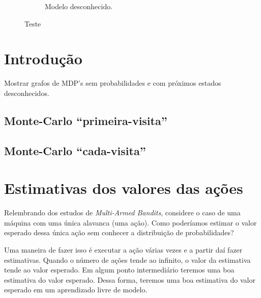 \documentclass{article}
\begin{document}
\begin{figure}[h]
\begin{subfigure}{.3\linewidth}
                    \caption{Modelo desconhecido.}
                \end{subfigure}
                \caption{Teste}
            \end{figure}


    \section{Introdução}
    
        Mostrar grafos de MDP's sem probabilidades e com próximos estados desconhecidos.
        
        \subsection{Monte-Carlo ``primeira-visita''}
        
        \subsection{Monte-Carlo ``cada-visita''}
    
    \section{Estimativas dos valores das ações}
    
        Relembrando dos estudos de \emph{Multi-Armed Bandits}, considere o caso de uma máquina com uma única alavanca (uma ação). Como poderíamos estimar o valor esperado dessa única ação sem conhecer a distribuição de probabilidades? 
        
        Uma maneira de fazer isso é executar a ação várias vezes e a partir daí fazer estimativas. Quando o número de ações tende ao infinito, o valor da estimativa tende ao valor esperado. Em algum ponto intermediário teremos uma boa estimativa do valor esperado. Dessa forma, teremos uma boa estimativa do valor esperado em um aprendizado livre de modelo.
\end{document}

